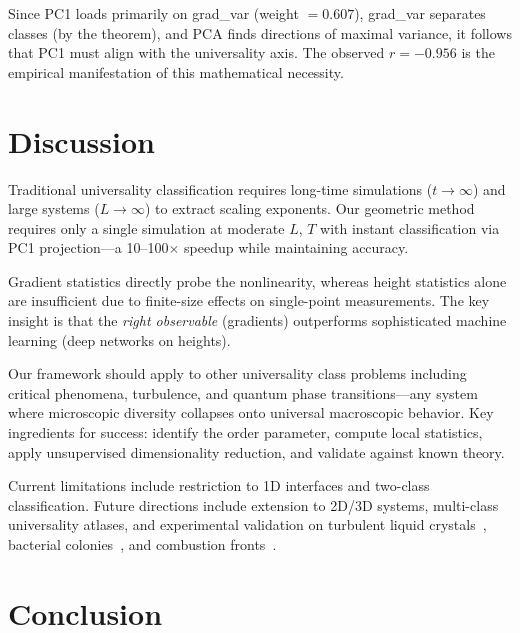 \documentclass[aps,prl,twocolumn,superscriptaddress,showpacs]{revtex4-2}
\begin{document}
Since PC1 loads primarily on grad\_var (weight $= 0.607$), grad\_var separates classes (by the theorem), and PCA finds directions of maximal variance, it follows that PC1 must align with the universality axis. The observed $r = -0.956$ is the empirical manifestation of this mathematical necessity.

\section{Discussion}

Traditional universality classification requires long-time simulations ($t \to \infty$) and large systems ($L \to \infty$) to extract scaling exponents. Our geometric method requires only a single simulation at moderate $L$, $T$ with instant classification via PC1 projection---a 10--100$\times$ speedup while maintaining accuracy.

Gradient statistics directly probe the nonlinearity, whereas height statistics alone are insufficient due to finite-size effects on single-point measurements. The key insight is that the \emph{right observable} (gradients) outperforms sophisticated machine learning (deep networks on heights).

Our framework should apply to other universality class problems including critical phenomena, turbulence, and quantum phase transitions---any system where microscopic diversity collapses onto universal macroscopic behavior. Key ingredients for success: identify the order parameter, compute local statistics, apply unsupervised dimensionality reduction, and validate against known theory.

Current limitations include restriction to 1D interfaces and two-class classification. Future directions include extension to 2D/3D systems, multi-class universality atlases, and experimental validation on turbulent liquid crystals~\cite{Takeuchi2010}, bacterial colonies~\cite{Hallatschek2007}, and combustion fronts~\cite{Myllys2001}.

\section{Conclusion}
\end{document}

